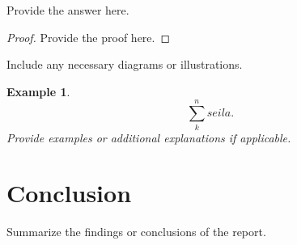 \documentclass[12pt]{article}
\newtheorem{example}[theorem]{Example}
\begin{document}
\begin{answer}
Provide the answer here.
\end{answer}

\begin{proof}
Provide the proof here.
\end{proof}

\begin{drawing}
Include any necessary diagrams or illustrations.
\end{drawing}

\begin{example}
\[
\sum_{k}^{n} seila
.\] 
Provide examples or additional explanations if applicable.
\end{example}


\section{Conclusion}
Summarize the findings or conclusions of the report.
\end{document}
